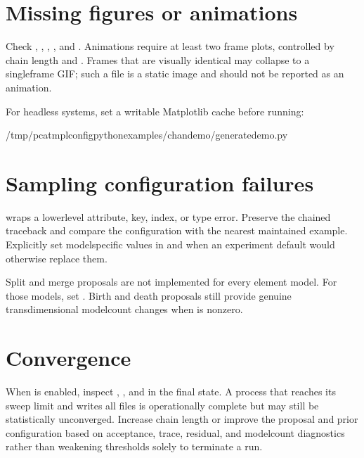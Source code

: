 \documentclass[letterpaper,10pt,english]{sphinxmanual}
\begin{document}
\section{Missing figures or animations}
\label{\detokenize{troubleshooting:missing-figures-or-animations}}
\sphinxAtStartPar
Check , , ,
, and . Animations require at least two frame
plots, controlled by chain length and . Frames that are visually
identical may collapse to a single\sphinxhyphen{}frame GIF; such a file is a static image and
should not be reported as an animation.

\sphinxAtStartPar
For headless systems, set a writable Matplotlib cache before running:

\begin{sphinxVerbatim}[commandchars=\\\{\}]
/tmp/pcat\PYGZhy{}mplconfigpythonexamples/chan\PYGZus{}demo/generate\PYGZus{}demo.py
\end{sphinxVerbatim}


\section{Sampling configuration failures}
\label{\detokenize{troubleshooting:sampling-configuration-failures}}
\sphinxAtStartPar
{} wraps
a lower\sphinxhyphen{}level attribute, key, index, or type error. Preserve the chained
traceback and compare the configuration with the nearest maintained example.
Explicitly set model\sphinxhyphen{}specific values in  and  when an
experiment default would otherwise replace them.

\sphinxAtStartPar
Split and merge proposals are not implemented for every element model. For
those models, set . Birth and death proposals still provide
genuine transdimensional model\sphinxhyphen{}count changes when  is nonzero.


\section{Convergence}
\label{\detokenize{troubleshooting:convergence}}
\sphinxAtStartPar
When  is enabled, inspect ,
, and  in the final state. A process
that reaches its sweep limit and writes all files is operationally complete but
may still be statistically unconverged. Increase chain length or improve the
proposal and prior configuration based on acceptance, trace, residual, and
model\sphinxhyphen{}count diagnostics rather than weakening thresholds solely to terminate a
run.
\end{document}
